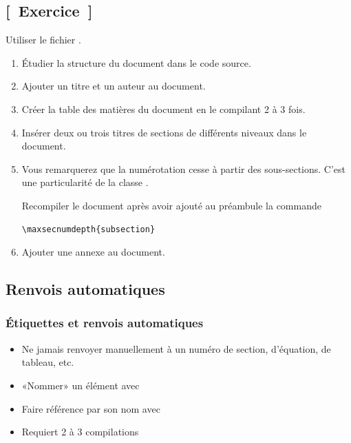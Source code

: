 \subsection{[~Exercice~]}

\begin{exercice}
  Utiliser le fichier .

  \begin{enumerate}
  \item Étudier la structure du document dans le code source.
  \item Ajouter un titre et un auteur au document.
  \item Créer la table des matières du document en le compilant 2 à 3
    fois.
  \item Insérer deux ou trois titres de sections de différents niveaux
    dans le document.
  \item Vous remarquerez que la numérotation cesse à partir des
    sous-sections. C'est une particularité de la classe
    .

    Recompiler le document après avoir ajouté au préambule la commande
\begin{lstlisting}
\maxsecnumdepth{subsection}
\end{lstlisting}
  \item Ajouter une annexe au document.
  \end{enumerate}
\end{exercice}

\subsection{Renvois automatiques}

\begin{frame}
  \frametitle{Étiquettes et renvois automatiques}

  \begin{itemize}
  \item Ne \alert{jamais} renvoyer manuellement à un numéro de
    section, d'équation, de tableau, etc.
  \item «Nommer» un élément avec 
  \item Faire référence par son nom avec 
  \item Requiert 2 à 3 compilations
  \end{itemize}
\end{frame}

